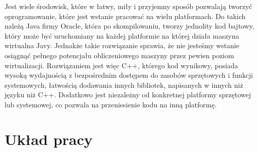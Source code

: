 Jest wiele środowisk, które w łatwy, miły i przyjemny sposób pozwalają tworzyć oprogramowanie, które jest wstanie pracować na wielu platformach.
Do takich należą Java firmy Oracle, która po skompilowaniu, tworzy jednolity kod bajtowy, który może być uruchomiany na każdej platformie na której działa maszyna wirtualna Javy.
Jednakże takie rozwiązanie sprawia, że nie jesteśmy wstanie osiągnąć pełnego potencjału obliczeniowego maszyny przez pewien poziom wirtualizacji.
Rozwiązaniem jest więc C++, którego kod wynikowy, posiada wysoką wydajnością z bezpośrednim dostępem do zasobów sprzętowych i funkcji systemowych, łatwością dodawania innych bibliotek, napisanych w innych niż języku niż C++.
Dodatkowo jest niezależny od konkretnej platformy sprzętowej lub systemowej, co pozwala na przeniesienie kodu na inną platformę.

\section{Układ pracy}